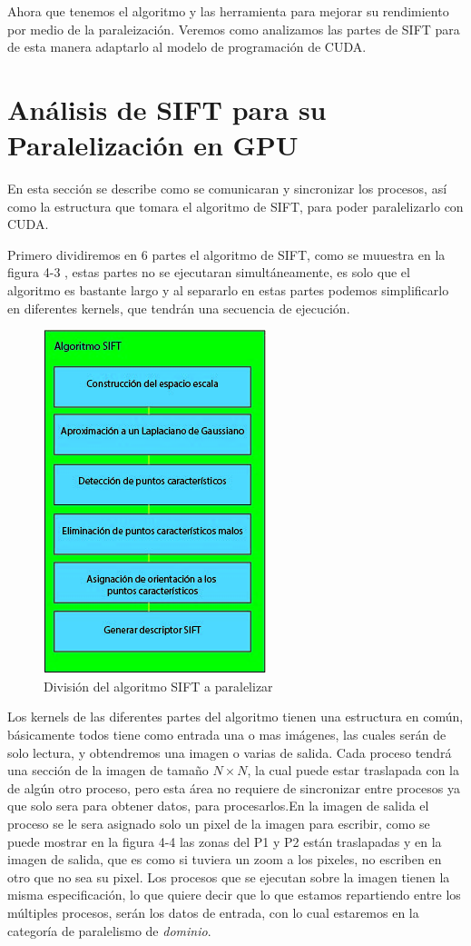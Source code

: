 Ahora que tenemos el algoritmo y las herramienta para mejorar su rendimiento por medio de la paraleización. Veremos como analizamos las partes de SIFT para de esta manera adaptarlo al modelo de programación de CUDA.
\pagebreak
\section{Análisis de SIFT para su Paralelización en GPU}

En esta sección se describe como se comunicaran y sincronizar los procesos, así como la estructura que tomara el algoritmo de SIFT, para poder paralelizarlo con CUDA. 

Primero dividiremos en 6 partes el algoritmo de SIFT, como se muuestra en la figura 4-3 , estas partes no se ejecutaran simultáneamente, es solo que el algoritmo es bastante largo y al separarlo en estas partes podemos simplificarlo en diferentes kernels, que tendrán una secuencia de ejecución. 

\begin{figure}[h]
			\centering
				\includegraphics[scale=1]{img/SIFTdiv.jpg}
			\caption{División del algoritmo SIFT a paralelizar}
\end{figure}



Los kernels de las diferentes partes del algoritmo tienen una estructura en común, básicamente todos tiene como entrada una o mas imágenes, las cuales serán de solo lectura, y obtendremos una imagen o varias de salida. Cada proceso tendrá una sección de la imagen de tamaño  $N \times N$, la cual puede estar traslapada con la de algún otro proceso, pero esta área no requiere de sincronizar entre procesos ya que solo sera para obtener datos, para procesarlos.En la imagen de salida el proceso se le sera asignado solo un pixel de la imagen para escribir, como se puede mostrar en la figura 4-4 las zonas del P1 y P2 están traslapadas y en la imagen de salida, que es como si tuviera un zoom a los pixeles, no escriben en otro que no sea su pixel. Los procesos que se ejecutan sobre la imagen tienen la misma especificación, lo que quiere decir que lo que estamos repartiendo entre los múltiples procesos, serán los datos de entrada, con lo cual estaremos en la categoría de paralelismo de \textit{dominio}.


